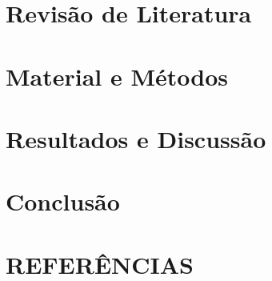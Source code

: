 \documentclass[
	12pt,				%
	openright,			%
	oneside,			%
	a4paper,			%
	brazil				%
	]{abntex2}
\begin{document}
\chapter{Revisão de Literatura} 
\label{chap:revi}


\chapter{Material e Métodos} 
\label{chap:mati}


\chapter{Resultados e Discussão} 
\label{chap:resul}


\chapter{Conclusão} 
\label{chap:conc}




\chapter{REFERÊNCIAS}
\begingroup
\renewcommand{\chapter}[2]{}%
\end{document}
